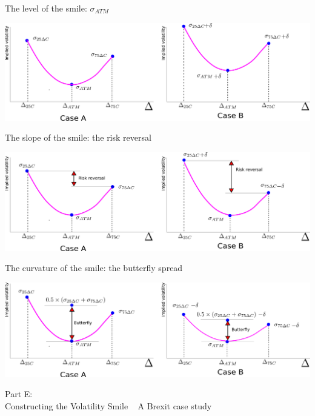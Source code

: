 \begin{frame}{The level of the smile: \(\sigma_{ATM}\)}

\includegraphics[width=1\linewidth]{images/figRRLevel}

\end{frame}

\begin{frame}{The slope of the smile: the risk reversal}

\includegraphics[width=1\linewidth]{images/figRRSlope}

\end{frame}

\begin{frame}{The curvature of the smile: the butterfly spread}

\includegraphics[width=1\linewidth]{images/figRRCurvature}

\end{frame}

\begin{frame}{}

\color{blue} \LARGE{Part E:}\\
\LARGE{Constructing the Volatility Smile} ~ \Large{A Brexit case study}

\end{frame}

